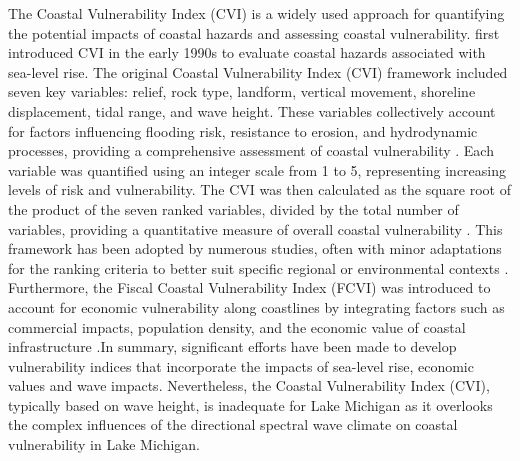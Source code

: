 The Coastal Vulnerability Index (CVI) is a widely used approach for quantifying
the potential impacts of coastal hazards and assessing coastal vulnerability.
\citet{gornitz_global_1991} first introduced CVI in the early 1990s to evaluate
coastal hazards associated with sea-level rise. The original Coastal
Vulnerability Index (CVI) framework included seven key variables: relief, rock
type, landform, vertical movement, shoreline displacement, tidal range, and wave
height. These variables collectively account for factors influencing flooding
risk, resistance to erosion, and hydrodynamic processes, providing a
comprehensive assessment of coastal vulnerability \citep{shaw_sensitivity_1998}.
Each variable was quantified using an integer scale from 1 to 5, representing
increasing levels of risk and vulnerability. The CVI was then calculated as the
square root of the product of the seven ranked variables, divided by the total
number of variables, providing a quantitative measure of overall coastal
vulnerability \citep{koroglu_comparison_2019}. This framework has been adopted
by numerous studies, often with minor adaptations for the ranking criteria to
better suit specific regional or environmental contexts
\citep[\eg][]{royo_rapid_2016,shaw_sensitivity_1998,thieler_national_2000}.
Furthermore, the Fiscal Coastal Vulnerability Index (FCVI) was introduced to
account for economic vulnerability along coastlines by integrating factors such
as commercial impacts, population density, and the economic value of coastal
infrastructure \citep{kantamaneni_assessing_2018}.In summary, significant
efforts have been made to develop vulnerability indices that incorporate the
impacts of sea-level rise, economic values and wave impacts.  Nevertheless, the
Coastal Vulnerability Index (CVI), typically based on wave height, is inadequate
for Lake Michigan as it overlooks the complex influences of the directional
spectral wave climate on coastal vulnerability in Lake Michigan.

